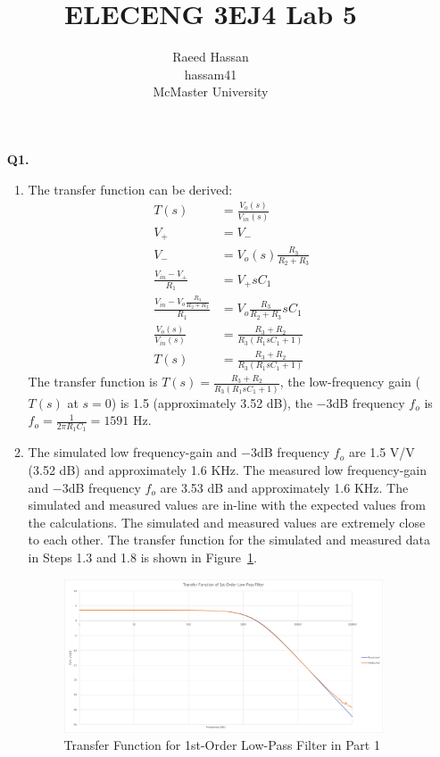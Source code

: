 \documentclass[12pt]{article}
\title{ELECENG 3EJ4 Lab 5}
\author{Raeed Hassan \\ hassam41 \\ McMaster University}
\begin{document}
\maketitle
\clearpage
\begin{itemize}
    \section*{Part 1}
    \item [\textbf{Q1.}]
    \begin{enumerate}
        \item The transfer function can be derived: 
        \begin{equation*}
        \begin{aligned}
            T(s) &= \frac{V_o(s)}{V_{in}(s)} \\
            V_+ &= V_- \\
            V_- &= V_o(s) \frac{R_3}{R_2 + R_3} \\
            \frac{V_{in} - V_+}{R_1} &= V_+ sC_1 \\
            \frac{V_{in} - V_o \frac{R_3}{R_2 + R_3}}{R_1} &= V_o \frac{R_3}{R_2 + R_3} sC_1 \\
            \frac{V_o(s)}{V_{in}(s)} &= \frac{R_3 + R_2}{R_3(R_1 sC_1 + 1)} \\
            T(s) &= \frac{R_3 + R_2}{R_3(R_1 sC_1 + 1)}
        \end{aligned}
        \end{equation*}
        The transfer function is $T(s) = \frac{R_3 + R_2}{R_3(R_1 sC_1 + 1)}$, the low-frequency gain ($T(s)$ at $s = 0$) is 1.5 (approximately 3.52 dB), the $-3$dB frequency $f_o$ is $f_o = \frac{1}{2\pi R_1 C_1} = 1591$ Hz.
        \item The simulated low frequency-gain and $-3$dB frequency $f_o$ are 1.5 V/V (3.52 dB) and approximately 1.6 KHz. The measured low frequency-gain and $-3$dB frequency $f_o$ are 3.53 dB and approximately 1.6 KHz. The simulated and measured values are in-line with the expected values from the calculations. The simulated and measured values are extremely close to each other. The transfer function for the simulated and measured data in Steps 1.3 and 1.8 is shown in Figure~\ref{fig:Q1}.
        \begin{figure}[ht]
        \centering
        \includegraphics[width=0.95\textwidth]{Q1}
        \caption{\label{fig:Q1}Transfer Function for 1st-Order Low-Pass Filter in Part 1}
        \end{figure}
    \end{enumerate}

\end{itemize}
\end{document}

